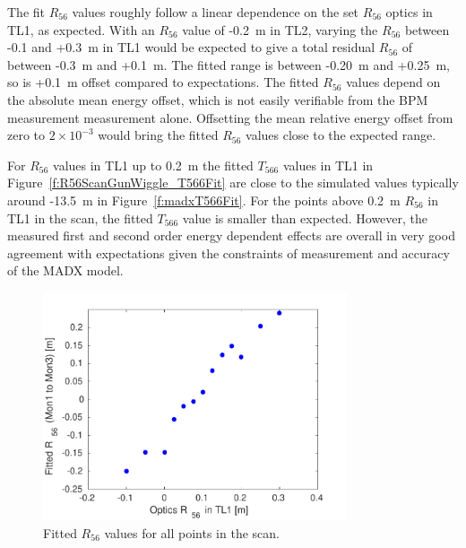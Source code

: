 The fit \(R_{56}\) values roughly follow a linear dependence on the set \(R_{56}\) optics in TL1, as expected. With an \(R_{56}\) value of -0.2~m in TL2, varying the \(R_{56}\) between -0.1 and +0.3~m in TL1 would be expected to give a total residual \(R_{56}\) of between -0.3~m and +0.1~m. The fitted range is between -0.20~m and +0.25~m, so is +0.1~m offset compared to expectations. The fitted \(R_{56}\) values depend on the absolute mean energy offset, which is not easily verifiable from the BPM measurement measurement alone. Offsetting the mean relative energy offset from zero to \(2\times10^{-3}\) would bring the fitted \(R_{56}\) values close to the expected range.

For \(R_{56}\) values in TL1 up to 0.2~m the fitted \(T_{566}\) values in TL1 in Figure~\ref{f:R56ScanGunWiggle_T566Fit} are close to the simulated values typically around -13.5~m in Figure~\ref{f:madxT566Fit}. For the points above 0.2~m \(R_{56}\) in TL1 in the scan, the fitted \(T_{566}\) value is smaller than expected. However, the measured first and second order energy dependent effects are overall in very good agreement with expectations given the constraints of measurement and accuracy of the MADX model.

\begin{figure}
  \centering
  \includegraphics[width=0.8\textwidth]{Figures/propagation/R56ScanGunWiggle_R56Fit}
  \caption{Fitted \(R_{56}\) values for all points in the scan.}
  \label{f:R56ScanGunWiggle_R56Fit}
\end{figure}

